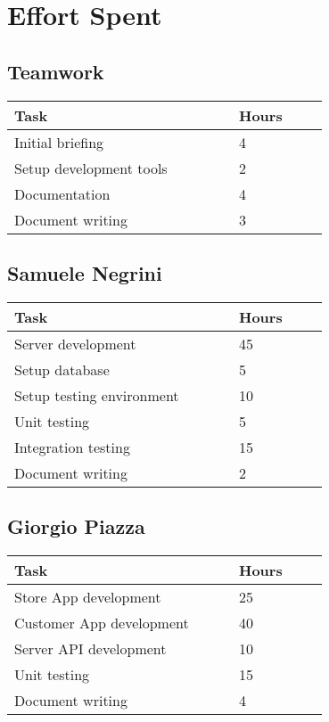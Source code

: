 \chapter{Effort Spent}

\section{Teamwork}
\vspace{2mm}
\begin{center}
    \begin{tabular}{@{}p{0.5\linewidth} p{0.2\linewidth}@{}}
        \hline
        \textbf{Task} & \textbf{Hours} \\ \hline
        Initial briefing & 4 \\ \hline
		Setup development tools & 2 \\ \hline
		Documentation & 4 \\ \hline
		Document writing & 3 \\ \hline
    \end{tabular}
\end{center}

\section{Samuele Negrini}
\vspace{2mm}
\begin{center}
	\begin{tabular}{@{}p{0.5\linewidth} p{0.2\linewidth}@{}}
		\hline
		\textbf{Task} & \textbf{Hours} \\ \hline
		Server development & 45 \\ \hline
		Setup database & 5 \\ \hline
		Setup testing environment & 10 \\ \hline
		Unit testing & 5 \\ \hline
		Integration testing & 15 \\ \hline
		Document writing & 2 \\ \hline
	\end{tabular}
\end{center}

\section{Giorgio Piazza}
\vspace{2mm}
\begin{center}
	\begin{tabular}{@{}p{0.5\linewidth} p{0.2\linewidth}@{}}
		\hline
		\textbf{Task} & \textbf{Hours} \\ \hline
		Store App development & 25 \\ \hline
		Customer App development & 40 \\ \hline
	    Server API development  & 10 \\ \hline
	    Unit testing & 15 \\ \hline
		Document writing & 4 \\ \hline
	\end{tabular}
\end{center}